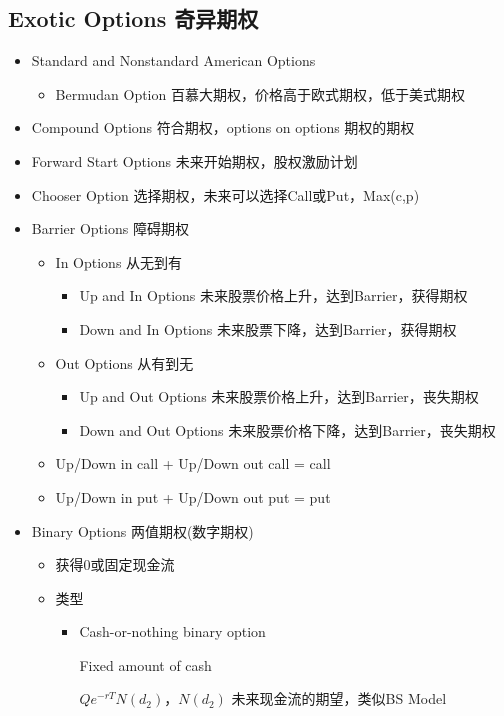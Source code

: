 \documentclass[a4paper,6pt,twoside,openany]{article}
\begin{document}
\subsection{Exotic Options 奇异期权}
\begin{itemize}
  \item Standard and Nonstandard American Options
    \begin{itemize}
    \item Bermudan Option 百慕大期权，价格高于欧式期权，低于美式期权
    \end{itemize}
  \item Compound Options 符合期权，options on options 期权的期权
  \item  Forward Start Options 未来开始期权，股权激励计划
  \item Chooser Option 选择期权，未来可以选择Call或Put，Max(c,p)
  \item Barrier Options 障碍期权
    \begin{itemize}
    \item In Options 从无到有
      \begin{itemize}
      \item Up and In Options 未来股票价格上升，达到Barrier，获得期权
      \item Down and In Options 未来股票下降，达到Barrier，获得期权
      \end{itemize}
    \item Out Options 从有到无
      \begin{itemize}
      \item Up and Out Options 未来股票价格上升，达到Barrier，丧失期权
      \item Down and Out Options 未来股票价格下降，达到Barrier，丧失期权
      \end{itemize}
    \item Up/Down in call + Up/Down out call = call
    \item Up/Down in put + Up/Down out put = put
    \end{itemize}
  \item Binary Options 两值期权(数字期权)
    \begin{itemize}
    \item 获得0或固定现金流
    \item 类型
      \begin{itemize}
      \item Cash-or-nothing binary option
        \par Fixed amount of cash
        \par $Qe^{-rT}N(d_2)$，$N(d_2)$ 未来现金流的期望，类似BS Model

\end{itemize}
\end{itemize}
\end{itemize}
\end{document}
